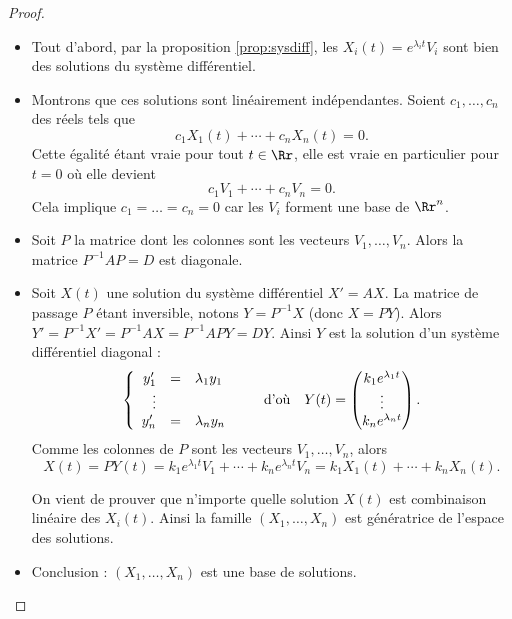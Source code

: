 \documentclass[12pt, class=report,crop=false]{standalone}
\begin{document}
\begin{proof}~
\begin{itemize}
  \item Tout d'abord, par la proposition \ref{prop:sysdiff}, les $X_i(t)=e^{\lambda_i t}V_i$ 
sont bien des solutions du système différentiel.

  \item Montrons que ces solutions sont linéairement indépendantes.
Soient $c_1,\dots,c_n$ des réels tels que 
$$c_1X_1(t)+\cdots+c_nX_n(t)=0.$$
Cette égalité étant vraie pour tout $t\in\Rr$, elle est vraie en particulier pour $t=0$ où elle devient
$$c_1V_1+\cdots+c_nV_n=0.$$
Cela implique $c_1=\dots=c_n=0$ car les $V_i$ forment une base de $\Rr^n$. 


  \item Soit $P$ la matrice dont les colonnes sont les vecteurs $V_1,\dots,V_n$.
Alors la matrice $P^{-1}AP=D$ est diagonale.

  \item Soit $X(t)$ une solution du système différentiel $X'=AX$.
  La matrice de passage $P$ étant inversible, notons $Y = P^{-1}X$ (donc $X=PY$).
  Alors $Y' = P^{-1}X' = P^{-1}AX = P^{-1}APY = DY$.
  Ainsi $Y$ est la solution d'un système différentiel diagonal :
$$\left\{\begin{array}{rcl}
y'_1 &=& \lambda_1 y_1\cr 
\vdots&&\cr 
y'_n &=& \lambda_n y_n
\end{array}\right. \qquad  {\text{d'où}}\ \ \ 
Y(t)=\begin{pmatrix}
k_1e^{\lambda_1t}\cr 
\vdots\cr 
k_ne^{\lambda_nt}
\end{pmatrix}.$$
Comme les colonnes de $P$ sont les vecteurs $V_1,\ldots,V_n$, alors 
$$X(t) = PY(t) = k_1e^{\lambda_1t}V_1+\cdots+k_ne^{\lambda_nt}V_n=k_1X_1(t)+\cdots+k_nX_n(t).$$

On vient de prouver que n'importe quelle solution $X(t)$ est combinaison linéaire des $X_i(t)$.
Ainsi la famille $(X_1,\ldots,X_n)$ est génératrice de l'espace des solutions.


  \item Conclusion : $(X_1,\ldots,X_n)$ est une base de solutions.
 \qedhere
\end{itemize}  
\end{proof}
\end{document}
